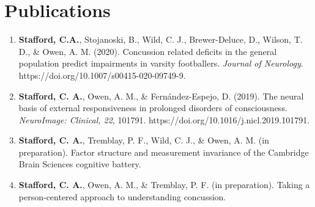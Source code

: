 \documentclass[letterpaper]{twentysecondcv} %
\begin{document}
\begin{twentyshort} %
\end{twentyshort}



\section{Publications}

\begin{enumerate} %
	\item \textbf{Stafford, C.A.}, Stojanoski, B., Wild, C. J., Brewer-Deluce, D., Wilson, T. D., \& Owen, A. M. (2020). Concussion related deficits in the general population predict impairments in varsity footballers. \emph{Journal of Neurology}.\newline
	https://doi.org/10.1007/s00415-020-09749-9.
	\item \textbf{Stafford, C. A.}, Owen, A. M., \& Fern\'andez-Espejo, D. (2019). The neural basis of external responsiveness in prolonged disorders of consciousness. \emph{NeuroImage: Clinical, 22}, 101791. https://doi.org/10.1016/j.nicl.2019.101791.
	\item \textbf{Stafford, C. A.}, Tremblay, P. F., Wild, C. J., \& Owen, A. M. (in preparation). Factor structure and measurement invariance of the Cambridge Brain Sciences cognitive battery.
	\item \textbf{Stafford, C. A.}, Owen, A. M., \& Tremblay, P. F. (in preparation). Taking a person-centered approach to understanding concussion.
\end{enumerate}

\end{document}
